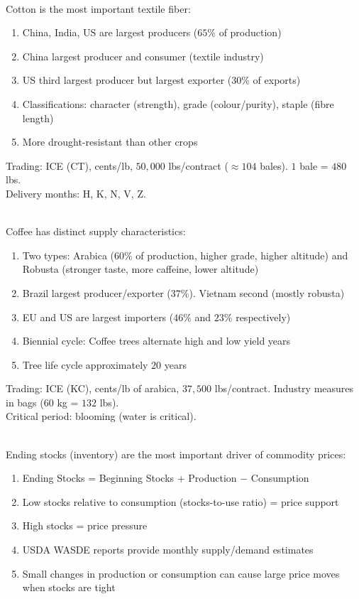 \documentclass[a4paper,oneside,openany]{book}
\begin{document}
\begin{remark} \\
Cotton is the most important textile fiber:
\begin{enumerate}[label=\roman*.]
\setlength{\itemsep}{0pt}
\item China, India, US are largest producers ($65\%$ of production)
\item China largest producer and consumer (textile industry)
\item US third largest producer but largest exporter ($30\%$ of exports)
\item Classifications: character (strength), grade (colour/purity), staple (fibre length)
\item More drought-resistant than other crops
\end{enumerate}
Trading: ICE (CT), cents/lb, $50,00$0 lbs/contract ($\approx 104$ bales). $1$ bale = $480$ lbs.\\
Delivery months: H, K, N, V, Z.
\end{remark}

\begin{remark} \\
Coffee has distinct supply characteristics:
\begin{enumerate}[label=\roman*.]
\setlength{\itemsep}{0pt}
\item Two types: Arabica ($60\%$ of production, higher grade, higher altitude) and Robusta (stronger taste, more caffeine, lower altitude)
\item Brazil largest producer/exporter ($37\%$). Vietnam second (mostly robusta)
\item EU and US are largest importers ($46\%$ and $23\%$ respectively)
\item Biennial cycle: Coffee trees alternate high and low yield years
\item Tree life cycle approximately $20$ years
\end{enumerate}
Trading: ICE (KC), cents/lb of arabica, $37,500$ lbs/contract. Industry measures in bags ($60$ kg = $132$ lbs).\\
Critical period: blooming (water is critical).
\end{remark}

\begin{remark} \\
Ending stocks (inventory) are the most important driver of commodity prices:
\begin{enumerate}[label=\roman*.]
\setlength{\itemsep}{0pt}
\item Ending Stocks = Beginning Stocks + Production $-$ Consumption
\item Low stocks relative to consumption (stocks-to-use ratio) = price support
\item High stocks = price pressure
\item USDA WASDE reports provide monthly supply/demand estimates
\item Small changes in production or consumption can cause large price moves when stocks are tight
\end{enumerate}
\end{remark}
\end{document}
